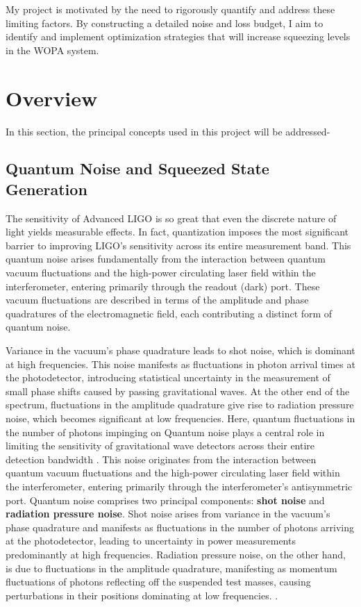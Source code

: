 \documentclass[colorlinks=true,pdfstartview=FitV,linkcolor=blue,
citecolor=red,urlcolor=magenta]{ligodoc}
\begin{document}
My project is motivated by the need to rigorously quantify and address these limiting factors. By constructing a detailed noise and loss budget, I aim to identify and implement optimization strategies that will increase squeezing levels in the WOPA system. 


\section{Overview}
In this section, the principal concepts used in this project will be addressed-
\subsection{Quantum Noise and Squeezed State Generation}
The sensitivity of Advanced LIGO is so great that even the discrete nature of light yields measurable effects. In fact, quantization imposes the most significant barrier to improving LIGO’s sensitivity across its entire measurement band. This quantum noise arises fundamentally from the interaction between quantum vacuum fluctuations and the high-power circulating laser field within the interferometer, entering primarily through the readout (dark) port. These vacuum fluctuations are described in terms of the amplitude and phase quadratures of the electromagnetic field, each contributing a distinct form of quantum noise.

Variance in the vacuum’s phase quadrature leads to shot noise, which is dominant at high frequencies. This noise manifests as fluctuations in photon arrival times at the photodetector, introducing statistical uncertainty in the measurement of small phase shifts caused by passing gravitational waves. At the other end of the spectrum, fluctuations in the amplitude quadrature give rise to radiation pressure noise, which becomes significant at low frequencies. Here, quantum fluctuations in the number of photons impinging on
Quantum noise plays a central role in limiting the sensitivity of gravitational wave detectors across their entire detection bandwidth \cite{mckenzie}. This noise originates from the interaction between quantum vacuum fluctuations and the high-power circulating laser field within the interferometer, entering primarily through the interferometer’s antisymmetric port. Quantum noise comprises two principal components: \textbf{shot noise} and \textbf{radiation pressure noise}. Shot noise arises from variance in the vacuum’s phase quadrature and manifests as fluctuations in the number of photons arriving at the photodetector, leading to uncertainty in power measurements predominantly at high frequencies. Radiation pressure noise, on the other hand, is due to fluctuations in the amplitude quadrature, manifesting as momentum fluctuations of photons reflecting off the suspended test masses, causing perturbations in their positions dominating at low frequencies. \cite{mckenzie}.
\end{document}
